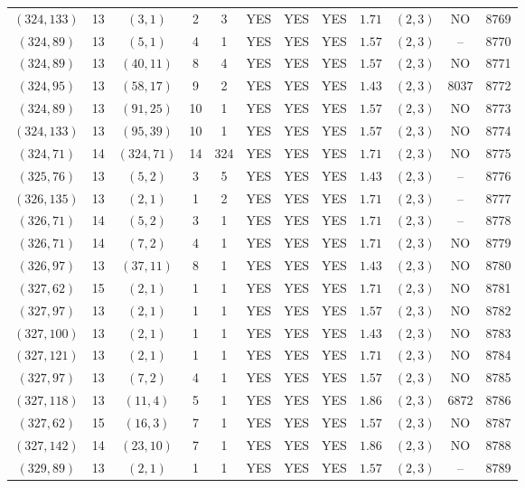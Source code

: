 \begin{longtable}{|c|c|c|c|c|c|c|c|c|c|c|c|}
$(324,133)$ & 13 & $(3,1)$ & 2 & 3 & YES & YES & YES & $1.71$ & $(2,3)$ & NO & 8769\\
$(324,89)$ & 13 & $(5,1)$ & 4 & 1 & YES & YES & YES & $1.57$ & $(2,3)$ & -- & 8770\\
$(324,89)$ & 13 & $(40,11)$ & 8 & 4 & YES & YES & YES & $1.57$ & $(2,3)$ & NO & 8771\\
$(324,95)$ & 13 & $(58,17)$ & 9 & 2 & YES & YES & YES & $1.43$ & $(2,3)$ & 8037 & 8772\\
$(324,89)$ & 13 & $(91,25)$ & 10 & 1 & YES & YES & YES & $1.57$ & $(2,3)$ & NO & 8773\\
$(324,133)$ & 13 & $(95,39)$ & 10 & 1 & YES & YES & YES & $1.57$ & $(2,3)$ & NO & 8774\\
$(324,71)$ & 14 & $(324,71)$ & 14 & 324 & YES & YES & YES & $1.71$ & $(2,3)$ & NO & 8775\\
$(325,76)$ & 13 & $(5,2)$ & 3 & 5 & YES & YES & YES & $1.43$ & $(2,3)$ & -- & 8776\\
$(326,135)$ & 13 & $(2,1)$ & 1 & 2 & YES & YES & YES & $1.71$ & $(2,3)$ & -- & 8777\\
$(326,71)$ & 14 & $(5,2)$ & 3 & 1 & YES & YES & YES & $1.71$ & $(2,3)$ & -- & 8778\\
$(326,71)$ & 14 & $(7,2)$ & 4 & 1 & YES & YES & YES & $1.71$ & $(2,3)$ & NO & 8779\\
$(326,97)$ & 13 & $(37,11)$ & 8 & 1 & YES & YES & YES & $1.43$ & $(2,3)$ & NO & 8780\\
$(327,62)$ & 15 & $(2,1)$ & 1 & 1 & YES & YES & YES & $1.71$ & $(2,3)$ & NO & 8781\\
$(327,97)$ & 13 & $(2,1)$ & 1 & 1 & YES & YES & YES & $1.57$ & $(2,3)$ & NO & 8782\\
$(327,100)$ & 13 & $(2,1)$ & 1 & 1 & YES & YES & YES & $1.43$ & $(2,3)$ & NO & 8783\\
$(327,121)$ & 13 & $(2,1)$ & 1 & 1 & YES & YES & YES & $1.71$ & $(2,3)$ & NO & 8784\\
$(327,97)$ & 13 & $(7,2)$ & 4 & 1 & YES & YES & YES & $1.57$ & $(2,3)$ & NO & 8785\\
$(327,118)$ & 13 & $(11,4)$ & 5 & 1 & YES & YES & YES & $1.86$ & $(2,3)$ & 6872 & 8786\\
$(327,62)$ & 15 & $(16,3)$ & 7 & 1 & YES & YES & YES & $1.57$ & $(2,3)$ & NO & 8787\\
$(327,142)$ & 14 & $(23,10)$ & 7 & 1 & YES & YES & YES & $1.86$ & $(2,3)$ & NO & 8788\\
$(329,89)$ & 13 & $(2,1)$ & 1 & 1 & YES & YES & YES & $1.57$ & $(2,3)$ & -- & 8789\\

\end{longtable}
